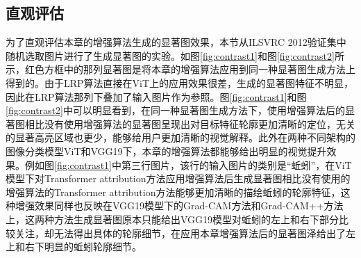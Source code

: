 \subsection{直观评估}

为了直观评估本章的增强算法生成的显著图效果，本节从ILSVRC 2012验证集中随机选取图片进行了生成显著图的实验。如图\ref{fig:contrast1}和图\ref{fig:contrast2}所示，红色方框中的那列显著图是将本章的增强算法应用到同一种显著图生成方法上得到的。由于LRP算法直接在ViT上的应用效果很差，生成的显著图特征不明显，因此在LRP算法那列下叠加了输入图片作为参照。图\ref{fig:contrast1}和图\ref{fig:contrast2}中可以明显看到，在同一种显著图生成方法下，使用增强算法后的显著图相比没有使用增强算法的显著图呈现出对目标特征轮廓更加清晰的定位，无关的显著高亮区域也更少，能够给用户更加清晰的视觉解释。此外在两种不同架构的图像分类模型ViT和VGG19下，本章的增强算法都能够给出明显的视觉提升效果。例如图\ref{fig:contrast1}中第三行图片，该行的输入图片的类别是“蚯蚓”，在ViT模型下对Transformer attribution方法应用增强算法后生成显著图相比没有使用的增强算法的Transformer attribution方法能够更加清晰的描绘蚯蚓的轮廓特征，这种增强效果同样也反映在VGG19模型下的Grad-CAM方法和Grad-CAM++方法上，这两种方法生成显著图原本只能给出VGG19模型对蚯蚓的左上和右下部分比较关注，却无法得出具体的轮廓细节，在应用本章增强算法后的显著图泽给出了左上和右下明显的蚯蚓轮廓细节。


